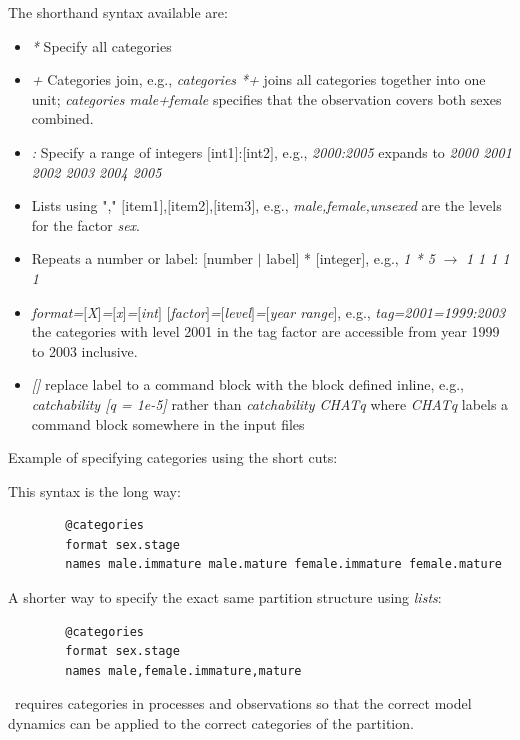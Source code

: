 The shorthand syntax available are: 

\begin{itemize}
	\item \textit{*} Specify all categories
	\item \textit{+} Categories join, e.g., \textit{categories *+} joins all categories together into one unit; \textit{categories male+female}
specifies that the observation covers both sexes combined.
    \item \textit{:} Specify a range of integers $[$int1$]$:$[$int2$]$, e.g., \textit{2000:2005} expands to \textit{2000 2001 2002 2003 2004 2005}
    \item Lists using "," $[$item1$]$,$[$item2$]$,$[$item3$]$, e.g., \textit{male,female,unsexed} are the levels for the factor \textit{sex}.
    \item Repeats a number or label: $[$number $\mid$ label$]$ * $[$integer$]$, e.g., \textit{1 * 5} $\rightarrow$ \textit{1 1 1 1 1}
    \item \textit{format=$[$X$]$=$[$x$]$=$[$int$]$}   
    \textit{$[$factor$]$=$[$level$]$=$[$year range$]$}, e.g., \textit{tag=2001=1999:2003} the categories with level 2001 in the tag factor are accessible from year 1999 to 2003 inclusive.
    \item \textit{[]} replace label to a command block with the block defined inline, e.g., \textit{catchability [q = 1e-5]} rather than \textit{catchability CHATq} where \textit{CHATq} labels a command block somewhere in the input files
\end{itemize}


Example of specifying categories using the short cuts:

This syntax is the long way:
{\small{\begin{verbatim}
		@categories
		format sex.stage
		names male.immature male.mature female.immature female.mature
\end{verbatim}}}

A shorter way to specify the exact same partition structure  using \textit{lists}:

{\small{\begin{verbatim}
		@categories
		format sex.stage
		names male,female.immature,mature
\end{verbatim}}}

\CNAME\ requires categories in processes and observations so that the correct model dynamics can be applied to the correct categories of the partition.

